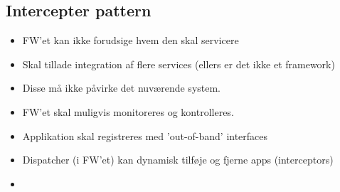 \documentclass[oneside, 10pt]{memoir}
\begin{document}
\subsection*{Intercepter pattern}
\begin{itemize}
	\item FW'et kan ikke forudsige hvem den skal servicere

	\item Skal tillade integration af flere services (ellers er det ikke et framework)

	\item Disse må ikke påvirke det nuværende system.

	\item FW'et skal muligvis monitoreres og kontrolleres.

	\item Applikation skal registreres med 'out-of-band' interfaces

	\item Dispatcher (i FW'et) kan dynamisk tilføje og fjerne apps (interceptors)

	\item 
\end{itemize}
\end{document}
